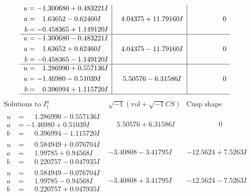 \documentclass[1p]{elsarticle_modified}
\theoremstyle{definition}
\newcommand{\I}{\sqrt{-1}}
\begin{document}
$$\begin{array}{c|c|c}
\begin{aligned}
u &= -1.300680 + 0.483221 I \\
a &= \phantom{-}1.63652 - 0.62460 I \\
b &= -0.458365 + 1.149120 I\end{aligned}
 & \phantom{-}4.04375 + 11.79160 I & \phantom{-0.000000 } 0 \\ \hline\begin{aligned}
u &= -1.300680 - 0.483221 I \\
a &= \phantom{-}1.63652 + 0.62460 I \\
b &= -0.458365 - 1.149120 I\end{aligned}
 & \phantom{-}4.04375 - 11.79160 I & \phantom{-0.000000 } 0 \\ \hline\begin{aligned}
u &= \phantom{-}1.286990 + 0.557136 I \\
a &= -1.46980 - 0.51039 I \\
b &= \phantom{-}0.396994 + 1.115720 I\end{aligned}
 & \phantom{-}5.50576 - 6.31586 I & \phantom{-0.000000 } 0\\
 \hline 
 \end{array}$$\newpage$$\begin{array}{c|c|c}  
\text{Solutions to }I^u_{1}& \I (\text{vol} + \sqrt{-1}CS) & \text{Cusp shape}\\
 \hline 
\begin{aligned}
u &= \phantom{-}1.286990 - 0.557136 I \\
a &= -1.46980 + 0.51039 I \\
b &= \phantom{-}0.396994 - 1.115720 I\end{aligned}
 & \phantom{-}5.50576 + 6.31586 I & \phantom{-0.000000 } 0 \\ \hline\begin{aligned}
u &= \phantom{-}0.584949 + 0.076704 I \\
a &= \phantom{-}1.99785 + 0.94568 I \\
b &= \phantom{-}0.220757 - 0.047935 I\end{aligned}
 & -3.40808 - 3.41795 I & -12.5624 + 7.5263 I \\ \hline\begin{aligned}
u &= \phantom{-}0.584949 - 0.076704 I \\
a &= \phantom{-}1.99785 - 0.94568 I \\
b &= \phantom{-}0.220757 + 0.047935 I\end{aligned}
 & -3.40808 + 3.41795 I & -12.5624 - 7.5263 I \\ \hline\begin{aligned}

\end{aligned}
\end{array}$$
\end{document}
